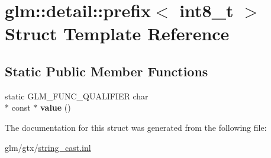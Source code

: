 \hypertarget{structglm_1_1detail_1_1prefix_3_01int8__t_01_4}{\section{glm\-:\-:detail\-:\-:prefix$<$ int8\-\_\-t $>$ Struct Template Reference}
\label{structglm_1_1detail_1_1prefix_3_01int8__t_01_4}
}
\subsection*{Static Public Member Functions}
\begin{DoxyCompactItemize}
\item 
\hypertarget{structglm_1_1detail_1_1prefix_3_01int8__t_01_4_afb4b2223c44e4e8f75bde375b0f874a2}{static G\-L\-M\-\_\-\-F\-U\-N\-C\-\_\-\-Q\-U\-A\-L\-I\-F\-I\-E\-R char \\*
const $\ast$ {\bfseries value} ()}\label{structglm_1_1detail_1_1prefix_3_01int8__t_01_4_afb4b2223c44e4e8f75bde375b0f874a2}

\end{DoxyCompactItemize}


The documentation for this struct was generated from the following file\-:\begin{DoxyCompactItemize}
\item 
glm/gtx/\hyperlink{string__cast_8inl}{string\-\_\-cast.\-inl}\end{DoxyCompactItemize}
